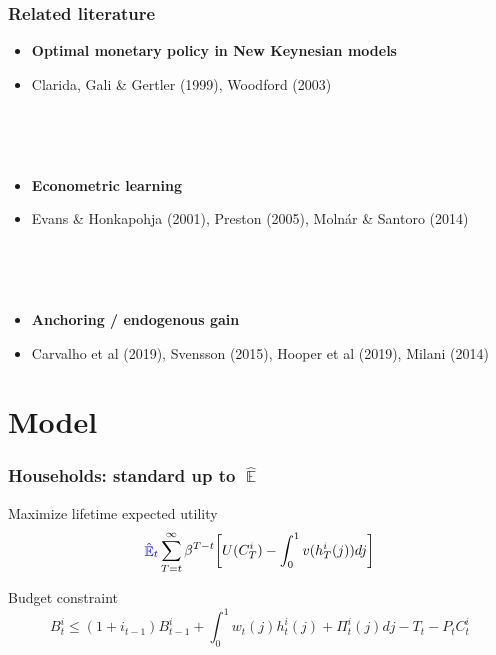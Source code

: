 \documentclass[11pt]{beamer}
\DeclareMathOperator{\E}{\mathbb{E}}
\begin{document}
\begin{frame}
	\frametitle{Related literature}

\begin{itemize}
\item \textbf{Optimal monetary policy in New Keynesian models}
\item[] Clarida, Gali \& Gertler (1999), Woodford (2003)

\

\

\item \textbf{Econometric learning}
\item[] Evans \& Honkapohja (2001), Preston (2005), Moln\'ar \& Santoro (2014)

\

\

\item \textbf{Anchoring / endogenous gain} 
\item[] Carvalho et al (2019), Svensson (2015), Hooper et al (2019), Milani (2014)
\end{itemize}



\end{frame}

\section{Model}

\begin{frame}
	\frametitle{Households: standard up to $\hat{\E}$}
	\label{HH}

Maximize lifetime expected utility
\begin{equation}
\textcolor{blue}{\hat{\E}_t}\sum^{\infty}_{T=t}\beta^{T-t} \bigg[ U(C^i_T) - \int_0^1 v(h^i_T(j)) dj \bigg]
\label{lifetime_U}
\end{equation}	

Budget constraint
\begin{equation}
 B^i_t \leq (1+i_{t-1})B^i_{t-1} + \int_0^1 w_t(j)h^i_t(j) + \Pi_t^i(j)  dj-T_t -P_tC^i_t
 \label{BC}
\end{equation}



\vfill

\hfill \hyperlink{details_HHs_firms}{}
\end{frame}
\end{document}

